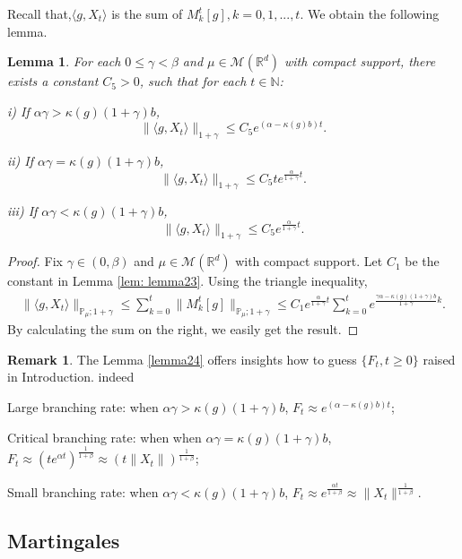\documentclass[12pt, a4paper]{amsart}
\newtheorem{lem}[thm]{Lemma}
\theoremstyle{definition}
\newtheorem{rem}[thm]{Remark}
\numberwithin{equation}{section}
\begin{document}
Recall that,$\langle g,X_t\rangle$ is the sum of $M_k^{t}[g], k=0,1,...,t$. We obtain the following lemma.

\begin{lem}\label{lemma24}
For each $0\leq \gamma < \beta$ and $\mu\in \mathcal M(\mathbb R^d)$ with compact support, there exists a constant $C_5>0$, such that for each $t\in \mathbb N$:

i) If $\alpha\gamma > \kappa(g)(1+\gamma)b$,
$$\|\langle g,X_t\rangle\|_{1+\gamma}\leq C_5 e^{(\alpha-\kappa(g)b)t}.$$

ii) If  $\alpha\gamma = \kappa(g)(1+\gamma)b$,
$$\|\langle g,X_t\rangle\|_{1+\gamma}\leq C_5 te^{\frac{\alpha}{1+\gamma}t}.$$

iii) If $\alpha\gamma < \kappa(g)(1+\gamma)b$,
$$\|\langle g,X_t\rangle\|_{1+\gamma}\leq C_5 e^{\frac{\alpha}{1+\gamma}t}.$$

\end{lem}
\begin{proof}
    Fix $\gamma \in (0,\beta)$ and $\mu \in \mathcal M(\mathbb R^d)$ with compact support.
    Let $C_1$ be the constant in Lemma \ref{lem: lemma23}.
    Using the triangle inequality, 
\begin{align}
    \|\langle g,X_t\rangle\|_{\mathbb P_\mu;1+\gamma}
    \leq \sum_{k=0}^{t}\|M_k^t[g]\|_{\mathbb P_\mu;1+\gamma}
    \leq C_1 e^{\frac{\alpha}{1+\gamma}t}\sum_{k=0}^{t} e^{\frac{\gamma\alpha-\kappa(g)(1+\gamma)b}{1+\gamma}k}.
\end{align}
By calculating the sum on the right, we easily get the result.
\end{proof}

\begin{rem}
    The Lemma \eqref{lemma24} offers insights how to guess $\{F_t, t\geq0\}$ raised in Introduction. indeed

    Large branching rate: when $\alpha\gamma > \kappa(g)(1+\gamma)b$, $F_t\approx e^{(\alpha-\kappa(g)b)t} $;

    Critical branching rate: when when  $\alpha\gamma = \kappa(g)(1+\gamma)b$, $F_t\approx (te^{\alpha t})^{\frac{1}{1+\beta}}\approx(t\|X_t\|)^{\frac{1}{1+\beta}}$;


    Small branching rate: when $\alpha\gamma < \kappa(g)(1+\gamma)b$, $F_t\approx e^{\frac{\alpha t}{1+\beta}}\approx \|X_t\|^{\frac{1}{1+\beta}}$.
\end{rem}
\subsection{Martingales}
\end{document}
